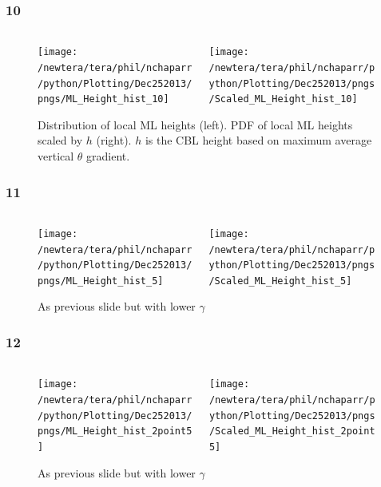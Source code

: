 \documentclass{beamer}
\newcommand\FrameText[1]{
\begin{textblock}{16}(1,2.5)
\raggedright #1
\end{textblock}}
\begin{document}
\begin{frame}
\frametitle{10}
\fontsize{12pt}{7.2}\selectfont
\begin{figure}
\begin{columns}[T]
   \begin{column}{.5\textwidth}
   \centering
   \texttt{[image: /newtera/tera/phil/nchaparr/python/Plotting/Dec252013/pngs/ML\_Height\_hist\_10]} 
   \end{column} 
   
   \begin{column}{.5\textwidth}
    \centering
    \texttt{[image: /newtera/tera/phil/nchaparr/python/Plotting/Dec252013/pngs/Scaled\_ML\_Height\_hist\_10]}
   \end{column}     
\end{columns}
\caption{Distribution of local ML heights (left).  PDF of local ML heights scaled by $h$ (right).  $h$ is the CBL height based on maximum average  vertical $\theta$ gradient.}
\end{figure}
\end{frame}

\begin{frame}
\frametitle{11}
\fontsize{12pt}{7.2}\selectfont
\begin{figure}
\begin{columns}[T]
   \begin{column}{.5\textwidth}
   \texttt{[image: /newtera/tera/phil/nchaparr/python/Plotting/Dec252013/pngs/ML\_Height\_hist\_5]} 
   \end{column} 
   
   \begin{column}{.5\textwidth}
    \texttt{[image: /newtera/tera/phil/nchaparr/python/Plotting/Dec252013/pngs/Scaled\_ML\_Height\_hist\_5]}
   \end{column}     
\end{columns}
\caption{As previous slide but with lower $\gamma$}
\end{figure}
\end{frame}

\begin{frame}
\frametitle{12}
\fontsize{12pt}{7.2}\selectfont
\begin{figure}
\begin{columns}[T]
   \begin{column}{.5\textwidth}
   \texttt{[image: /newtera/tera/phil/nchaparr/python/Plotting/Dec252013/pngs/ML\_Height\_hist\_2point5]} 
   \end{column} 
   
   \begin{column}{.5\textwidth}
    \texttt{[image: /newtera/tera/phil/nchaparr/python/Plotting/Dec252013/pngs/Scaled\_ML\_Height\_hist\_2point5]}
   \end{column}     
\end{columns}
\caption{As previous slide but with lower $\gamma$}
\end{figure}
\end{frame}
\end{document}
